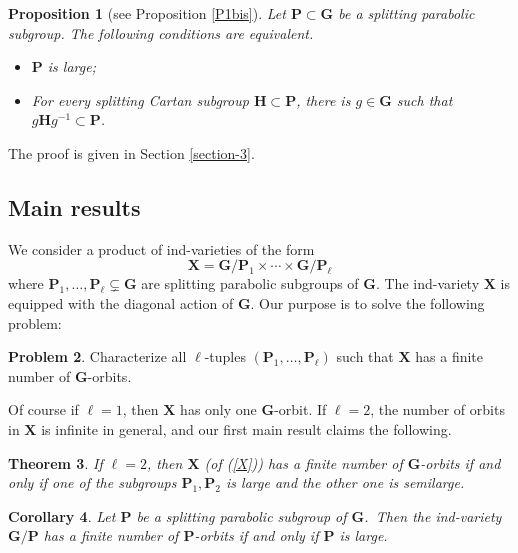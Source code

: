 \documentclass[12pt]{amsart}
\newcommand{\G}{\mathbf{G}}
\renewcommand{\H}{\mathbf{H}}
\renewcommand{\P}{\mathbf{P}}
\newcommand{\X}{\mathbf{X}}
\numberwithin{equation}{section}
\newtheorem{theorem}{Theorem}[section]
\newtheorem{corollary}[theorem]{Corollary}
\newtheorem{proposition}[theorem]{Proposition}
\theoremstyle{definition}
\newtheorem{problem}[theorem]{Problem}
\begin{document}
\begin{proposition}[see Proposition \ref{P1bis}]
\label{P1}
Let $\P\subset\G$ be a splitting parabolic subgroup. The following conditions are equivalent.
\begin{itemize}
\item[\rm (i)] $\P$ is large;
\item[\rm (ii)] For every splitting Cartan subgroup $\H\subset\P$, there is $g\in \G$ such that $g\H g^{-1}\subset\P$.
\end{itemize}
\end{proposition}

The proof is given in Section \ref{section-3}.

\subsection{Main results} 
We consider a product of ind-varieties of the form
\begin{equation}
\label{X}
\X=\G/\P_1\times\cdots\times\G/\P_\ell
\end{equation}
where $\P_1,\ldots,\P_\ell\subsetneq\G$ are splitting parabolic subgroups of $\G$. 
The ind-variety $\X$ is equipped with the diagonal action of $\G$. Our purpose is to solve the following problem:

\begin{problem}
\label{Problem1}
Characterize all $\ell$-tuples $(\P_1,\ldots,\P_\ell)$ such that $\X$ has a finite number of $\G$-orbits.
\end{problem}


Of course if $\ell=1$, then $\X$ has only one $\G$-orbit. 
If $\ell=2$, the number of orbits in $\X$ is infinite in general, and our first main result claims the following.

\begin{theorem}
\label{T1}
If $\ell=2$, then $\X$ (of (\ref{X})) has a finite number of $\G$-orbits if and only if
one of the subgroups $\P_1,\P_2$ is large and the other one is semilarge.
\end{theorem}

\begin{corollary}
Let $\P$ be a splitting parabolic subgroup of $\G$.\ Then the ind-variety $\G/\P$ has a finite number of $\P$-orbits if and only if $\P$ is large.
\end{corollary}
\end{document}
